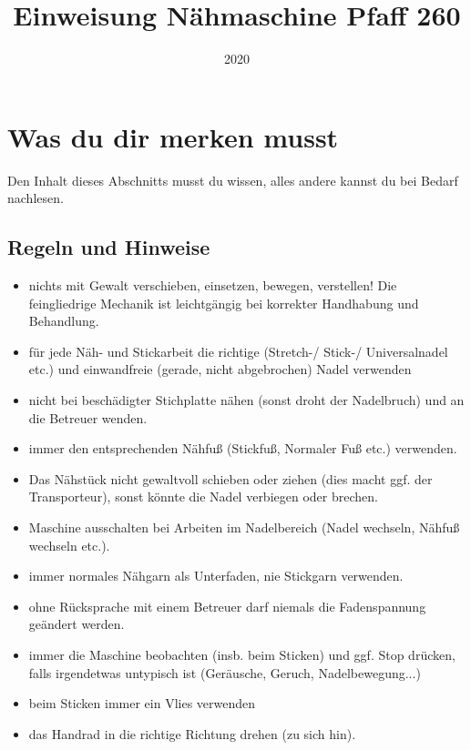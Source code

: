 \documentclass{\basedir/fablab-document}
\date{2020}
\author{}
\title{Einweisung Nähmaschine Pfaff 260}
\renewcommand{\todo}[1]{\textbf{\color{red}{TODO: #1}}}
\begin{document}
\maketitle



{\LARGE  \todo{ACHTUNG UNFERTIG - Es ist noch keine Einweisung möglich bis das Dokument fertig ist und dieser Hinweis entfernt wurde. Der jetzige Inhalt ist ohne nachzudenken von der Stickmaschine kopiert und vieles stimmt nicht.}}



\section{Was du dir merken musst}
Den Inhalt dieses Abschnitts musst du wissen, alles andere kannst du bei Bedarf nachlesen.
\subsection{Regeln und Hinweise}
\begin{itemize}
 \item nichts mit Gewalt verschieben, einsetzen, bewegen, verstellen! Die feingliedrige Mechanik ist leichtgängig bei korrekter Handhabung und Behandlung.
 \item für jede Näh- und Stickarbeit die richtige (Stretch-/ Stick-/ Universalnadel etc.) und einwandfreie (gerade, nicht abgebrochen) Nadel verwenden
 \item nicht bei beschädigter Stichplatte nähen (sonst droht der Nadelbruch) und an die Betreuer wenden.
 \item immer den entsprechenden Nähfuß (Stickfuß, Normaler Fuß etc.) verwenden.
 \item Das Nähstück nicht gewaltvoll schieben oder ziehen (dies macht ggf. der Transporteur), sonst könnte die Nadel verbiegen oder brechen.
 \item Maschine ausschalten bei Arbeiten im Nadelbereich (Nadel wechseln, Nähfuß wechseln etc.).
 \item immer normales Nähgarn als Unterfaden, nie Stickgarn verwenden.
 \item ohne Rücksprache mit einem Betreuer darf niemals die Fadenspannung geändert werden.
 \item immer die Maschine beobachten (insb. beim Sticken) und ggf. Stop drücken, falls irgendetwas untypisch ist (Geräusche, Geruch, Nadelbewegung...)
 \item beim Sticken immer ein Vlies verwenden
 \item das Handrad in die richtige Richtung drehen (zu sich hin).
\end{itemize}
\end{document}
